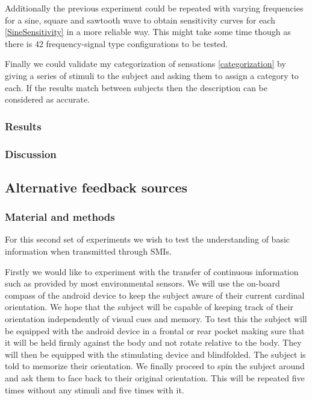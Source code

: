 \documentclass[10pt,journal,compsoc]{IEEEtran}
\begin{document}
Additionally the previous experiment could be repeated with varying frequencies for a sine, square and sawtooth wave to obtain sensitivity curves for each \ref{SineSensitivity} in a more reliable way. This might take some time though as there is 42 frequency-signal type configurations to be tested.

Finally we could validate my categorization of sensations \ref{categorization} by giving a series of stimuli to the subject and asking them to assign a category to each. If the results match between subjects then the description can be considered as accurate.

\subsubsection{Results}
		
\subsubsection{Discussion}

\subsection{Alternative feedback sources}
\subsubsection{Material and methods}
For this second set of experiments we wish to test the understanding of basic information when transmitted through SMIs.

Firstly we would like to experiment with the transfer of continuous information such as provided by most environmental sensors. We will use the on-board compass of the android device to keep the subject aware of their current cardinal orientation. We hope that the subject will be capable of keeping track of their orientation independently of visual cues and memory. To test this the subject will be equipped with the android device in a frontal or rear pocket making sure that it will be held firmly against the body and not rotate relative to the body. They will then be equipped with the stimulating device and blindfolded. The subject is told to memorize their orientation. We finally proceed to spin the subject around and ask them to face back to their original orientation. This will be repeated five times without any stimuli and five times with it.
\end{document}
